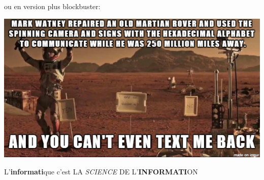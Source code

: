 \documentclass[french]{beamer}
\begin{document}
\begin{frame}
ou en version plus blockbuster:
 \begin{center}
\href{https://www.youtube.com/embed/ffB0Je-xjKg}{\includegraphics[height=0.7\textheight]{./martian.jpg}}
\end{center}
\end{frame}

\begin{frame}
L'\textbf{informati}que c'est LΑ \emph{SCIENCΕ} DΕ
L'\textbf{INFORMATI}ON
\end{frame}
\end{document}

